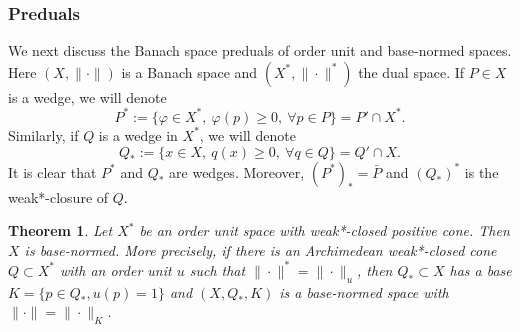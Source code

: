 \documentclass[12pt]{article}
\newtheorem{thm}{Theorem}
\theoremstyle{remark}
\newcommand{\<}{\langle}
\begin{document}
\subsubsection*{Preduals}

We next discuss the Banach space preduals of order unit and base-normed spaces. Here $(X,\|\cdot\|)$ is a Banach space and $(X^*,\|\cdot\|^*)$ the dual space.  If $P\in X$ is a wedge, we will denote 
\[
P^*:=\{\varphi\in X^*,\ \varphi(p)\ge 0,\ \forall p\in P\}= P'\cap X^*.
\]
Similarly, if $Q$ is a wedge in $X^*$, we will denote 
\[
Q_*:=\{x\in X,\ q(x)\ge 0,\ \forall q\in Q\}= Q'\cap X.
\]
It is clear that $P^*$ and $Q_*$ are wedges. Moreover, $(P^*)_*=\bar P$ and $(Q_*)^*$ is the weak*-closure of $Q$. 

\begin{thm}\cite{ellis, asell} Let $X^*$ be  an order unit space with weak*-closed positive cone. Then $X$ is base-normed. More precisely, 
if there is an Archimedean weak*-closed cone $Q\subset X^*$ with an order unit $u$  such that $\|\cdot\|^*=\|\cdot\|_u$, 
 then  $Q_*\subset X$ has a base $K=\{p\in Q_*, u(p)=1\}$ and $(X,Q_*,K)$ is a base-normed 
space with $\|\cdot\|=\|\cdot\|_K$.

\end{thm}
\end{document}
